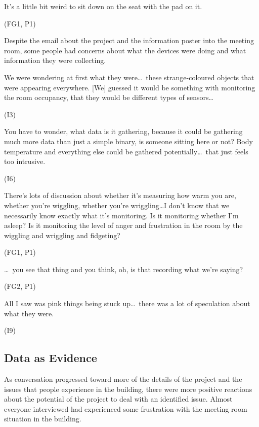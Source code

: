 \begin{qt}It’s a little bit weird to sit down on the seat with the pad on it.\end{qt} (FG1, P1)

Despite the email about the project and the information poster into
the meeting room, some people had concerns about  what the devices
were doing and what information they were collecting. 

\begin{qt}We were wondering at first what they were\ldots\  these strange-coloured
objects that were appearing everywhere. [We] guessed it would be
something with monitoring the room occupancy, that they would be
different types of sensors\ldots \end{qt} (I3)

\begin{qt}You have to wonder, what data is it gathering, because it
  could be gathering much more data than just a simple binary, is
  someone sitting here or not? Body temperature and everything else
  could be gathered potentially\ldots\ that just feels too
  intrusive.\end{qt} (I6)

\begin{qt}There’s lots of discussion about whether it’s measuring how
  warm you are, whether you’re wiggling, whether you’re wriggling…I
  don’t know that we necessarily know exactly what it’s monitoring. Is
  it monitoring whether I’m asleep? Is it monitoring the level of
  anger and frustration in the room by the wiggling and wriggling and
  fidgeting?\end{qt} (FG1, P1)

\begin{qt}\ldots\  you see that thing and you think, oh, is that
recording what we’re saying?\end{qt} (FG2, P1)

\begin{qt}All I saw was pink things being stuck up\ldots\ there was a
  lot of speculation about what they were.\end{qt} (I9) 



\subsection{Data as Evidence}

As conversation progressed toward more of the details of the
project and the issues that people experience in the building, there
were more positive reactions about the potential of the project to
deal with an identified issue. Almost everyone interviewed had
experienced some frustration with the meeting room situation in the
building.

